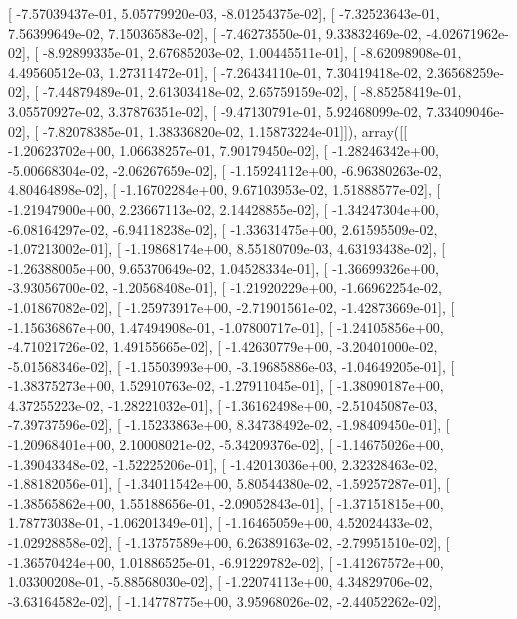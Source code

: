 \documentclass{article}
\begin{document}
       [ -7.57039437e-01,   5.05779920e-03,  -8.01254375e-02],
       [ -7.32523643e-01,   7.56399649e-02,   7.15036583e-02],
       [ -7.46273550e-01,   9.33832469e-02,  -4.02671962e-02],
       [ -8.92899335e-01,   2.67685203e-02,   1.00445511e-01],
       [ -8.62098908e-01,   4.49560512e-03,   1.27311472e-01],
       [ -7.26434110e-01,   7.30419418e-02,   2.36568259e-02],
       [ -7.44879489e-01,   2.61303418e-02,   2.65759159e-02],
       [ -8.85258419e-01,   3.05570927e-02,   3.37876351e-02],
       [ -9.47130791e-01,   5.92468099e-02,   7.33409046e-02],
       [ -7.82078385e-01,   1.38336820e-02,   1.15873224e-01]]), array([[ -1.20623702e+00,   1.06638257e-01,   7.90179450e-02],
       [ -1.28246342e+00,  -5.00668304e-02,  -2.06267659e-02],
       [ -1.15924112e+00,  -6.96380263e-02,   4.80464898e-02],
       [ -1.16702284e+00,   9.67103953e-02,   1.51888577e-02],
       [ -1.21947900e+00,   2.23667113e-02,   2.14428855e-02],
       [ -1.34247304e+00,  -6.08164297e-02,  -6.94118238e-02],
       [ -1.33631475e+00,   2.61595509e-02,  -1.07213002e-01],
       [ -1.19868174e+00,   8.55180709e-03,   4.63193438e-02],
       [ -1.26388005e+00,   9.65370649e-02,   1.04528334e-01],
       [ -1.36699326e+00,  -3.93056700e-02,  -1.20568408e-01],
       [ -1.21920229e+00,  -1.66962254e-02,  -1.01867082e-02],
       [ -1.25973917e+00,  -2.71901561e-02,  -1.42873669e-01],
       [ -1.15636867e+00,   1.47494908e-01,  -1.07800717e-01],
       [ -1.24105856e+00,  -4.71021726e-02,   1.49155665e-02],
       [ -1.42630779e+00,  -3.20401000e-02,  -5.01568346e-02],
       [ -1.15503993e+00,  -3.19685886e-03,  -1.04649205e-01],
       [ -1.38375273e+00,   1.52910763e-02,  -1.27911045e-01],
       [ -1.38090187e+00,   4.37255223e-02,  -1.28221032e-01],
       [ -1.36162498e+00,  -2.51045087e-03,  -7.39737596e-02],
       [ -1.15233863e+00,   8.34738492e-02,  -1.98409450e-01],
       [ -1.20968401e+00,   2.10008021e-02,  -5.34209376e-02],
       [ -1.14675026e+00,  -1.39043348e-02,  -1.52225206e-01],
       [ -1.42013036e+00,   2.32328463e-02,  -1.88182056e-01],
       [ -1.34011542e+00,   5.80544380e-02,  -1.59257287e-01],
       [ -1.38565862e+00,   1.55188656e-01,  -2.09052843e-01],
       [ -1.37151815e+00,   1.78773038e-01,  -1.06201349e-01],
       [ -1.16465059e+00,   4.52024433e-02,  -1.02928858e-02],
       [ -1.13757589e+00,   6.26389163e-02,  -2.79951510e-02],
       [ -1.36570424e+00,   1.01886525e-01,  -6.91229782e-02],
       [ -1.41267572e+00,   1.03300208e-01,  -5.88568030e-02],
       [ -1.22074113e+00,   4.34829706e-02,  -3.63164582e-02],
       [ -1.14778775e+00,   3.95968026e-02,  -2.44052262e-02],
\end{document}
